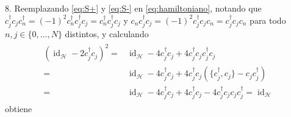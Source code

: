 \documentclass{article}
\DeclareMathOperator{\id}{id}
\begin{document}
8. Reemplazando \eqref{eq:S+} y \eqref{eq:S-} en \eqref{eq:hamiltoniano}, notando que $c_j^\dagger c_j c_n^\dagger=(-1)^2c_n^\dagger c_j^\dagger c_j=c_n^\dagger c_j^\dagger c_j$ y $c_n c_j^\dagger c_j=(-1)^2c_j^\dagger c_j c_n=c_j^\dagger c_j c_n$ para todo $n,j\in\{0,\dots,N\}$ distintos, y calculando
\begin{align}
\begin{split}
(\id_\mathcal{H}-2c_j^\dagger c_j)^2=&\id_\mathcal{H}-4c_j^\dagger c_j+4c_j^\dagger c_j c_j^\dagger c_j\\
=&\id_\mathcal{H}-4c_j^\dagger c_j+4c_j^\dagger c_j (\{c_j^\dagger,c_j\}-c_jc_j^\dagger)\\
=&\id_\mathcal{H}-4c_j^\dagger c_j+4c_j^\dagger c_j-4c_j^\dagger c_j c_jc_j^\dagger=\id_\mathcal{H}
\end{split}
\end{align} 
obtiene
\end{document}
